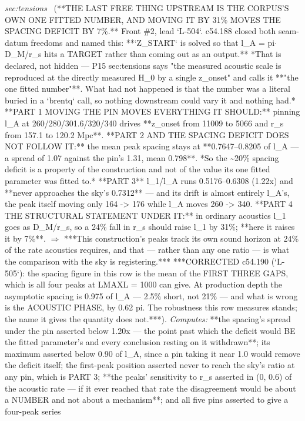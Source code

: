 \begin{description}
\textit{sec:tensions} \ (**THE LAST FREE THING UPSTREAM IS THE CORPUS'S OWN ONE FITTED NUMBER, AND MOVING IT BY 31\% MOVES THE SPACING DEFICIT BY 7\%.** Front \#2, lead `L-504`. c54.188 closed both seam-datum freedoms and named this: **`Z\_START` is solved so that l\_A = pi\ensuremath{\cdot}D\_M/r\_s hits a TARGET rather than coming out as an output.** *That is declared, not hidden --- P15 sec:tensions says "the measured acoustic scale is reproduced at the directly measured H\_0 by a single z\_onset" and calls it **"the one fitted number"**. What had not happened is that the number was a literal buried in a `brentq` call, so nothing downstream could vary it and nothing had.* **PART 1 MOVING THE PIN MOVES EVERYTHING IT SHOULD:** pinning l\_A at 260/280/301.6/320/340 drives **z\_onset from 11009 to 5066 and r\_s from 157.1 to 120.2 Mpc**. **PART 2 AND THE SPACING DEFICIT DOES NOT FOLLOW IT:** the mean peak spacing stays at **0.7647--0.8205 of l\_A --- a spread of 1.07 against the pin's 1.31, mean 0.798**. *So the \textasciitilde{}20\% spacing deficit is a property of the construction and not of the value its one fitted parameter was fitted to.* **PART 3** l\_1/l\_A runs 0.5176--0.6308 (1.22x) and **never approaches the sky's 0.7312** --- and its drift is almost entirely l\_A's, the peak itself moving only 164 -> 176 while l\_A moves 260 -> 340. **PART 4 THE STRUCTURAL STATEMENT UNDER IT:** in ordinary acoustics l\_1 goes as D\_M/r\_s, so a 24\% fall in r\_s should raise l\_1 by 31\%; **here it raises it by 7\%**. \ensuremath{\Rightarrow} ***This construction's peaks track its own sound horizon at 24\% of the rate acoustics requires, and that --- rather than any one ratio --- is what the comparison with the sky is registering.***  ***CORRECTED c54.190 (`L-505`): the spacing figure in this row is the mean of the FIRST THREE GAPS, which is all four peaks at LMAXL = 1000 can give. At production depth the asymptotic spacing is 0.975 of l\_A --- 2.5\% short, not 21\% --- and what is wrong is the ACOUSTIC PHASE, by 0.62 pi. The robustness this row measures stands; the name it gives the quantity does not.***). 
\emph{Computes:} **the spacing's spread under the pin asserted below 1.20x --- the point past which the deficit would BE the fitted parameter's and every conclusion resting on it withdrawn**; its maximum asserted below 0.90 of l\_A, since a pin taking it near 1.0 would remove the deficit itself; the first-peak position asserted never to reach the sky's ratio at any pin, which is PART 3; **the peaks' sensitivity to r\_s asserted in (0, 0.6) of the acoustic rate --- if it ever reached that rate the disagreement would be about a NUMBER and not about a mechanism**; and all five pins asserted to give a four-peak series

\end{description}
